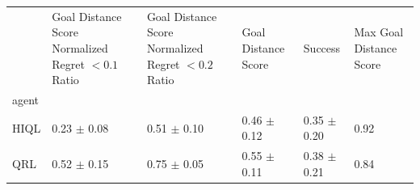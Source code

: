 \begin{tabular}{llllll}
\toprule
 & Goal Distance Score Normalized Regret $< 0.1$ Ratio & Goal Distance Score Normalized Regret $< 0.2$ Ratio & Goal Distance Score & Success & Max Goal Distance Score \\
agent &  &  &  &  &  \\
\midrule
HIQL & 0.23 $\pm$ 0.08 & 0.51 $\pm$ 0.10 & 0.46 $\pm$ 0.12 & 0.35 $\pm$ 0.20 & 0.92 \\
QRL & 0.52 $\pm$ 0.15 & 0.75 $\pm$ 0.05 & 0.55 $\pm$ 0.11 & 0.38 $\pm$ 0.21 & 0.84 \\
\bottomrule
\end{tabular}
